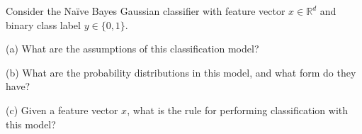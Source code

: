 Consider the Naïve Bayes Gaussian classifier with feature vector \(x\in\mathbb{R}^d\) and binary class label \(y\in\{0,1\}\).


(a) What are the assumptions of this classification model?


(b) What are the probability distributions in this model, and what form do they have?


(c) Given a feature vector \(x\), what is the rule for performing classification with this model?
